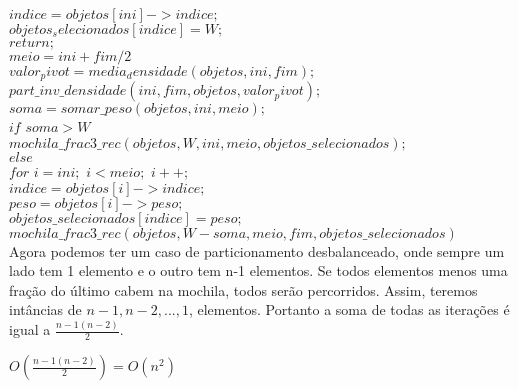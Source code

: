 \documentclass[10pt,a4paper]{article}
\begin{document}
	\hspace{2cm}$indice = objetos[ini]->indice;$\\
	
	\hspace{2cm}$objetos_selecionados[indice] = W;$\\
	
	\hspace{2cm}$return;$\\
	
	\hspace{1cm}$meio = ini+fim/2$\\
	
	\hspace{1cm}$valor_pivot = media_densidade(objetos, ini, fim);$\\
	
	\hspace{1cm}$part\_inv\_densidade(ini,fim,objetos,valor_pivot);$\\
	
	\hspace{1cm}$soma = somar\_peso(objetos,ini,meio);$\\
	
	\hspace{1cm}$if$ $soma > W$\\
	
	\hspace{2cm}$mochila\_frac3\_rec(objetos,W,ini, meio, objetos\_selecionados);$\\
	
	\hspace{1cm}$else$\\
	
	\hspace{2cm}$for$ $i=ini;$ $i<meio;$ $i++;$\\
	
	\hspace{3cm}$indice = objetos[i]->indice;$\\
	
	\hspace{3cm}$peso = objetos[i]->peso;$\\
	
	\hspace{3cm}$objetos\_selecionados[indice] = peso;$\\
	
	\hspace{2cm}$mochila\_frac3\_rec(objetos,W - soma,meio,fim, objetos\_selecionados)$\\
	
	
	Agora podemos ter um caso de particionamento desbalanceado, onde sempre um lado tem 1 elemento e o outro tem n-1 elementos. Se todos elementos menos uma fração do último cabem na mochila, todos serão percorridos. Assim, teremos intâncias de $n-1, n-2, ..., 1$, elementos. Portanto a soma de todas as iterações é igual a $\frac{n-1(n-2)}{2}.$
	
	\begin{center}
		$O(\frac{n-1(n-2)}{2}) = O(n^{2})$
	\end{center}
\end{document}
